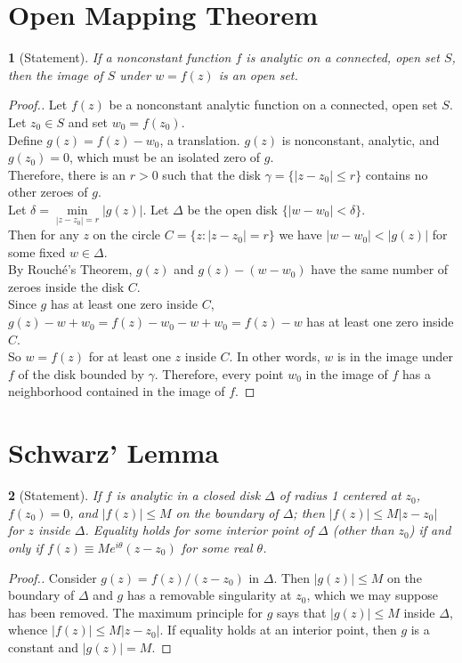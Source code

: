 \documentclass[12pt]{article}
\theoremstyle{named}
\newtheorem*{theorem}{}
\begin{document}
\section{Open Mapping Theorem}
\begin{theorem}[Statement]
	If a nonconstant function $f$ is analytic on a connected, open set $S$, then the image of
	$S$ under $w = f(z)$ is an open set.
\end{theorem}
\begin{proof}[Proof.]
Let $f(z)$ be a nonconstant analytic function on a connected, open set $S$.
\\ Let $z_{0} \in S$ and set $w_{0} = f(z_{0})$.
\\ Define $g(z) = f(z) - w_{0}$, a translation.  $g(z)$ is nonconstant, analytic, and $g(z_{0}) = 0$, which must
be an isolated zero of $g$.
\\ Therefore, there is an $r > 0$ such that the disk $\gamma = \{ |z - z_{0}| \leq r \}$ contains no other zeroes of $g$.
\\ Let $\delta = \min\limits_{|z - z_{0}| = r} |g(z)|$.
Let $\Delta$ be the open disk  $\{ |w - w_{0}| < \delta \}$.
\\ Then for any $z$ on the circle $C = \{z: |z - z_{0}| = r\}$ we have $|w - w_{0}| < |g(z)|$ for some fixed $w \in \Delta$.
\\ By Rouch\'{e}'s Theorem, $g(z)$ and $g(z) - (w - w_{0})$ have the same number of zeroes inside the disk $C$.
\\ Since $g$ has at least one zero inside $C$, $g(z) - w + w_{0} = f(z) - w_{0} - w + w_{0} = f(z) - w$
has at least one zero inside $C$.
\\ So $w = f(z)$ for at least one $z$ inside $C$.  In other words,
$w$ is in the image under $f$ of the disk bounded by $\gamma$.
Therefore, every point $w_{0}$ in the image of $f$ has a neighborhood contained in the image of $f$.
\end{proof}

%

\section{Schwarz' Lemma}
\begin{theorem}[Statement]
	If $f$ is analytic in a closed disk $\Delta$ of radius 1 centered at $z_0$, $f(z_0) = 0$, and
	$|f(z)| \leq M$ on the boundary of $\Delta$; then $|f(z)| \leq M|z-z_0|$ for $z$ inside $\Delta$.
	Equality holds for some interior point of $\Delta$ (other than $z_0$) if and only if
	$f(z) \equiv Me^{i\theta}(z-z_{0})$ for some real $\theta$.
\end{theorem}
\begin{proof}[Proof.]
Consider $g(z) = f(z) / (z-z_0)$ in $\Delta$.  Then $|g(z)| \leq M$ on the boundary of $\Delta$ and $g$ has a
removable singularity at $z_0$, which we may suppose has been removed.  The maximum principle for $g$ says that
$|g(z)| \leq M$ inside $\Delta$, whence $|f(z)| \leq M|z-z_0|$.  If equality holds at an interior point, then
$g$ is a constant and $|g(z)| = M$.
\end{proof}
\end{document}
